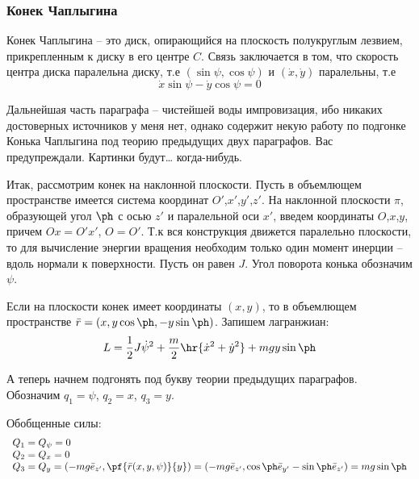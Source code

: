 \documentclass[a4paper,12pt]{article}
\begin{document}
\subsubsection{Конек Чаплыгина}
\newcommand{\half}{\frac{1}{2}}
\begin{df}
  Конек Чаплыгина -- это диск, опирающийся на плоскость полукруглым
  лезвием, прикрепленным к диску в его центре $C$. Связь заключается в
  том, что скорость центра диска паралельна диску,
  т.е $(\sin\psi,\cos\psi)$ и $(\dot x, \dot y)$ паралельны, т.е
  \begin{displaymath}
    \dot x\sin\psi - \dot y\cos\psi = 0
  \end{displaymath}
\end{df}
\begin{petit}
 Дальнейшая часть параграфа -- чистейшей воды импровизация, ибо
 никаких достоверных источников у меня нет, однако содержит некую
 работу по подгонке Конька Чаплыгина под теорию предыдущих двух
 параграфов. Вас предупреждали. Картинки будут\dots{} когда-нибудь.
\end{petit}
Итак, рассмотрим конек на наклонной плоскости. Пусть в объемлющем
пространстве имеется система координат $O'$,$x'$,$y'$,$z'$.  На
наклонной плоскости $\pi$, образующей угол $\ph$ с осью $z'$ и
паралельной оси $x'$, введем координаты $O$,$x$,$y$, причем $Ox =
O'x'$, $O = O'$.  Т.к вся конструкция движется паралельно плоскости,
то для вычисление энергии вращения необходим только один момент
инерции -- вдоль нормали к поверхности. Пусть он равен $J$. Угол
поворота конька обозначим $\psi$.

Если на плоскости конек имеет координаты $(x,y)$, то в объемлющем пространстве
$\bar r = (x,y\cos\ph, -y\sin\ph)$. Запишем лагранжиан:
\begin{displaymath}
  L =\half J{\dot \psi}^2 + \frac{m}{2}\hr{{\dot x}^2 + {\dot y}^2} +mgy\sin\ph
\end{displaymath}

 А теперь начнем подгонять под букву теории предыдущих параграфов.
Обозначим $q_1=\psi$, $q_2 = x$, $q_3 = y$.

Обобщенные силы:
\begin{displaymath}
  \begin{array}{l}
    Q_1  = Q_\psi =0\\
    Q_2 = Q_x =0 \\
    Q_3 = Q_y = (-mg\bar e_{z'}, \pf{\bar r(x,y,\psi)}{y}) =  (-mg\bar e_{z'}, \cos\ph \bar e_{y'} - \sin\ph\bar e_{z'}) = mg\sin\ph
  \end{array}
\end{displaymath}
\end{document}
